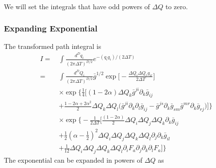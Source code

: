 We will set the integrals that have odd powers of $\Delta Q$ to zero.  

\subsubsection{Expanding Exponential}

The transformed path integral is 
\begin{align}
I=\,& \int \frac{d^Dq_i}{(2\pi \Delta T)^{D/2}} e^{-(q_iq_i)/(2\Delta T)}\\
=\,&\int \frac{d^DQ_i}{(2\pi \Delta T)^{D/2}}\bar{g}^{1/2}
\exp\bigg[-\frac{\Delta Q_i \Delta Q_rg_{ir}}{2\Delta T}\bigg] \nonumber\\
&\times\exp\bigg\{
\frac{1}{4}\big[(1-2\alpha)\Delta Q_k \bar{g}^{ji}\partial_k\bar{g}_{ij}\nonumber\\
&+ \frac{1-2\alpha+2\alpha^2}{2}\Delta Q_k\Delta Q_l 
\big(\bar{g}^{ji}\partial_k\partial_l\bar{g}_{ij}
-\bar{g}^{js}\partial_k\bar{g}_{sm}\bar{g}^{mr}\partial_k\bar{g}_{rj}\big)
\big]\bigg\}\nonumber\\
&\times\exp\bigg\{-\frac{1}{2\Delta T}\big[
\frac{(1-2\alpha)}{2}\Delta Q_i \Delta Q_j\Delta Q_k\partial_k\bar{g}_{ij}  \nonumber\\
&+\frac{1}{2}\left(\alpha-\frac{1}{2}\right)^2\Delta Q_i \Delta Q_j\Delta Q_k\Delta Q_l
\partial_j\partial_k\bar{g}_{il}\nonumber\\
&+\frac{1}{12}\Delta Q_i \Delta Q_j\Delta Q_k\Delta Q_l\partial_i F_a 
\partial_j\partial_k\partial_lF_a
\big]\bigg\}
\end{align}
The exponential can be expanded in powers of $\Delta Q$ as 
